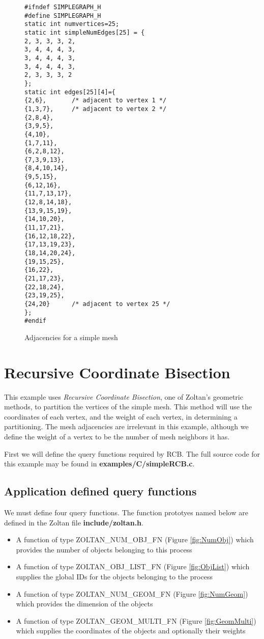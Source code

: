 \begin{figure}
\begin{flushleft}
\begin{verbatim}
#ifndef SIMPLEGRAPH_H
#define SIMPLEGRAPH_H
static int numvertices=25;
static int simpleNumEdges[25] = {
2, 3, 3, 3, 2,
3, 4, 4, 4, 3,
3, 4, 4, 4, 3,
3, 4, 4, 4, 3,
2, 3, 3, 3, 2
};
static int edges[25][4]={
{2,6},       /* adjacent to vertex 1 */
{1,3,7},     /* adjacent to vertex 2 */
{2,8,4},
{3,9,5},
{4,10},
{1,7,11},
{6,2,8,12},
{7,3,9,13},
{8,4,10,14},
{9,5,15},
{6,12,16},
{11,7,13,17},
{12,8,14,18},
{13,9,15,19},
{14,10,20},
{11,17,21},
{16,12,18,22},
{17,13,19,23},
{18,14,20,24},
{19,15,25},
{16,22},
{21,17,23},
{22,18,24},
{23,19,25},
{24,20}      /* adjacent to vertex 25 */
};
#endif
\end{verbatim}
\end{flushleft}
\caption{Adjacencies for a simple mesh}
\label{fig:simpleGraphDotH}
\end{figure}

\clearpage
\section{Recursive Coordinate Bisection}

This example uses \emph{Recursive Coordinate Bisection}, 
one of Zoltan's geometric methods, to partition
the vertices of the simple mesh.  This method will use
the coordinates of each vertex, and the weight of each
vertex, in determining a partitioning.  The mesh adjacencies are
irrelevant in this example, although we define the weight of
a vertex to be the number of mesh neighbors it has.

First we will define the query functions required by RCB.
The full source code for this example may be found in
\textbf{examples/C/simpleRCB.c}.

\subsection{Application defined query functions}

We must define four query functions.  The function prototyes named 
below are defined in the Zoltan file \textbf{include/zoltan.h}.

\begin{itemize}
\item A function of type ZOLTAN\_NUM\_OBJ\_FN (Figure \ref{fig:NumObj}) which provides the number of objects belonging to this process 
\item A function of type ZOLTAN\_OBJ\_LIST\_FN (Figure \ref{fig:ObjList}) which supplies the global IDs for the objects belonging to the process
\item A function of type ZOLTAN\_NUM\_GEOM\_FN (Figure \ref{fig:NumGeom}) which provides the dimension of the objects
\item A function of type ZOLTAN\_GEOM\_MULTI\_FN (Figure \ref{fig:GeomMulti}) which supplies the coordinates of the objects and optionally their weights
\end{itemize}

